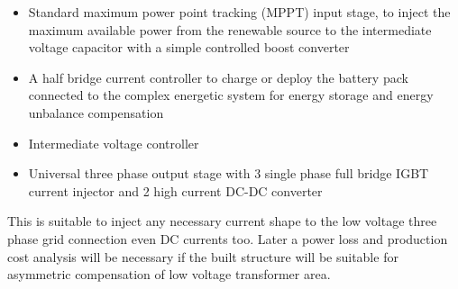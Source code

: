         \begin{itemize}
            \item Standard maximum power point tracking (MPPT) input stage, to inject the maximum available power from the renewable source to the intermediate voltage capacitor with a simple controlled boost converter
            \item A half bridge current controller to charge or deploy the battery pack connected to the complex energetic system for energy storage and energy unbalance compensation
            \item Intermediate voltage controller
            \item Universal three phase output stage with 3 single phase full bridge IGBT current injector and 2 high current DC-DC converter
        \end{itemize}
    This is suitable to inject any necessary current shape to the low voltage three phase grid connection even DC currents too. Later a power loss and production cost analysis will be necessary if the built structure will be suitable for asymmetric compensation of low voltage transformer area.


